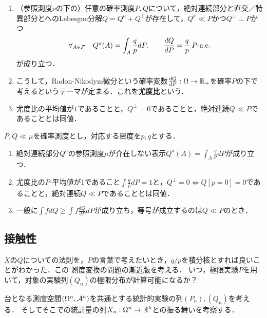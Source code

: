 \documentclass[uplatex,dvipdfmx]{jsreport}
\begin{document}
\begin{motivation}\mbox{}
    \begin{enumerate}
        \item （参照測度$\nu$の下の）任意の確率測度$P,Q$について，絶対連続部分と直交／特異部分とへのLebesgue分解$Q=Q^a+Q^\perp$が存在して，$Q^a\ll P$かつ$Q^\perp\perp P$かつ
        \[\forall_{A\in\mathcal{F}}\quad Q^a(A)=\int_A\frac{q}{p}dP,\qquad \frac{dQ}{dP}=\frac{q}{p}\;P\text{-a.e.}\]
        が成り立つ．
        \item こうして，Radon-Nikodym微分という確率変数$\frac{dQ}{dP}:\Omega\to\mathbb{R}_+$を確率$P$の下で考えるというテーマが定まる．これを\textbf{尤度比}という．
        \item 尤度比の平均値が$1$であることと，$Q^\perp=0$であることと，絶対連続$Q\ll P$であることとは同値．
    \end{enumerate}
\end{motivation}

\begin{lemma}
    $P,Q\ll\mu$を確率測度とし，対応する密度を$p,q$とする．
    \begin{enumerate}
        \item 絶対連続部分$Q^a$の参照測度$\mu$が介在しない表示$Q^a(A)=\int_A\frac{q}{p}dP$が成り立つ．
        \item 尤度比の$P$-平均値が$1$であること$\int\frac{q}{p}dP=1$と，$Q^\perp=0\Leftrightarrow Q[p=0]=0$であることと，絶対連続$Q\ll P$であることとは同値．
        \item 一般に$\int fdQ\ge\int f\frac{dQ}{dP}dP$が成り立ち，等号が成立するのは$Q\ll P$のとき．
    \end{enumerate}
\end{lemma}

\subsection{接触性}

\begin{tcolorbox}[colframe=ForestGreen, colback=ForestGreen!10!white,breakable,colbacktitle=ForestGreen!40!white,coltitle=black,fonttitle=\bfseries\sffamily,
title=]
    $X$の$Q$についての法則を，$P$の言葉で考えたいとき，$q/p$を積分核とすれば良いことがわかった．この
    測度変換の問題の漸近版を考える．
    いつ，極限実験$P$を用いて，対象の実験列$(Q_n)$の極限分布が計算可能になるか？
\end{tcolorbox}

\begin{notation}
    台となる測度空間$(\Omega^n,\mathcal{A}^n)$を共通とする統計的実験の列$(P_n),(Q_n)$を考える．
    そしてそこでの統計量の列$X_n:\Omega^n\to\mathbb{R}^k$との振る舞いを考察する．
\end{notation}
\end{document}
